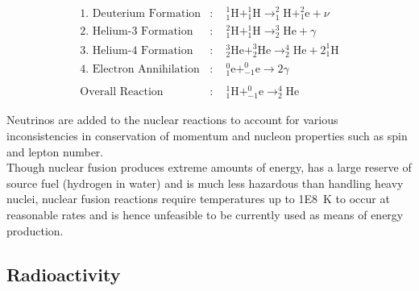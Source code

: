 \documentclass[../main]{subfiles}
\begin{document}
	\begin{equation*} \begin{aligned}
		\text{1. Deuterium Formation} & : \quad ^1_1\text{H} + ^1_1\text{H} \rightarrow ^2_1\text{H} + ^2_1\text{e} + \nu \\
		\text{2. Helium-3 Formation} & : \quad ^2_1\text{H} + ^1_1\text{H} \rightarrow ^3_2\text{He} + \gamma\\
		\text{3. Helium-4 Formation} & : \quad ^3_2\text{He} + ^3_2\text{He} \rightarrow ^4_2\text{He} + 2^1_1\text{H} \\
		\text{4. Electron Annihilation} & : \quad ^0_1\text{e} + ^0_{-1}\text{e} \rightarrow 2\gamma \\
			&	\\
		\text{Overall Reaction} & : \quad ^1_1\text{H} + ^0_{-1}\text{e} \rightarrow ^4_2\text{He}
	\end{aligned} \end{equation*}


	Neutrinos are added to the nuclear reactions to account for various inconsistencies in conservation of momentum and nucleon properties such as spin and lepton number. \\

	Though nuclear fusion produces extreme amounts of energy, has a large reserve of source fuel (hydrogen in water) and is much less hazardous than handling heavy nuclei, nuclear fusion reactions require temperatures up to \SI{1E8}{\K} to occur at reasonable rates and is hence unfeasible to be currently used as means of energy production. \\

	\subsection{Radioactivity}



\end{document}
